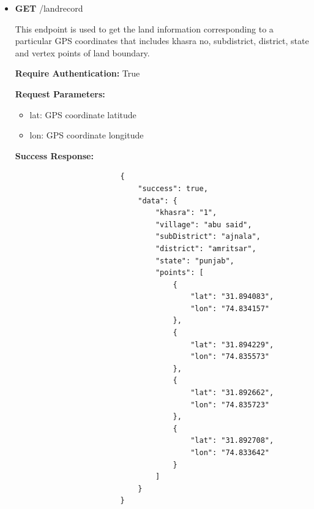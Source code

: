 \documentclass{article}
\begin{document}
\begin{itemize}
            \item \textbf{GET} /landrecord
                \begin{addmargin}[1em]{2em}%
                    This endpoint is used to get the land information corresponding to a particular GPS coordinates that includes khasra no, subdistrict, district, state and vertex points of land boundary.
                    \par\textbf{Require Authentication:} True
                    \par\textbf{Request Parameters:}
                    \begin{itemize}
                        \item lat: GPS coordinate latitude
                        \item lon: GPS coordinate longitude
                    \end{itemize}
                    \par\textbf{Success Response:}
                    \begin{listing}[H]
                    \begin{verbatim}
                        {
                            "success": true,
                            "data": {
                                "khasra": "1",
                                "village": "abu said",
                                "subDistrict": "ajnala",
                                "district": "amritsar",
                                "state": "punjab",
                                "points": [
                                    {
                                        "lat": "31.894083",
                                        "lon": "74.834157"
                                    },
                                    {
                                        "lat": "31.894229",
                                        "lon": "74.835573"
                                    },
                                    {
                                        "lat": "31.892662",
                                        "lon": "74.835723"
                                    },
                                    {
                                        "lat": "31.892708",
                                        "lon": "74.833642"
                                    }
                                ]
                            }
                        }
                    \end{verbatim}
                   \end{listing}
                \end{addmargin}
           

\end{itemize}
\end{document}
